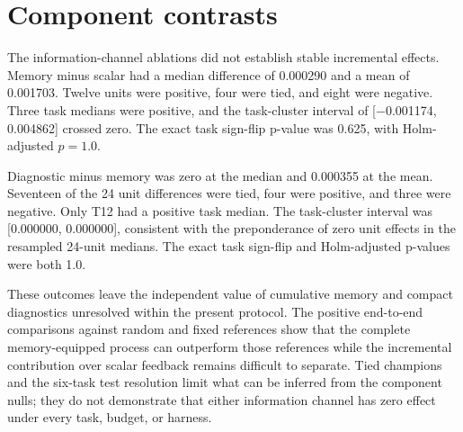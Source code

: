 \section{Component contrasts}
\label{sec:components}

The information-channel ablations did not establish stable incremental effects. Memory minus scalar had a median difference of 0.000290 and a mean of 0.001703. Twelve units were positive, four were tied, and eight were negative. Three task medians were positive, and the task-cluster interval of [$-$0.001174, 0.004862] crossed zero. The exact task sign-flip p-value was 0.625, with Holm-adjusted $p=1.0$.

Diagnostic minus memory was zero at the median and 0.000355 at the mean. Seventeen of the 24 unit differences were tied, four were positive, and three were negative. Only T12 had a positive task median. The task-cluster interval was [0.000000, 0.000000], consistent with the preponderance of zero unit effects in the resampled 24-unit medians. The exact task sign-flip and Holm-adjusted p-values were both 1.0.

These outcomes leave the independent value of cumulative memory and compact diagnostics unresolved within the present protocol. The positive end-to-end comparisons against random and fixed references show that the complete memory-equipped process can outperform those references while the incremental contribution over scalar feedback remains difficult to separate. Tied champions and the six-task test resolution limit what can be inferred from the component nulls; they do not demonstrate that either information channel has zero effect under every task, budget, or harness.
